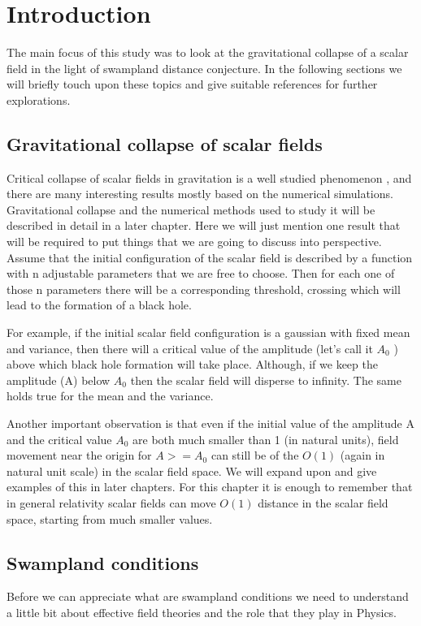 \chapter{Introduction}

The main focus of this study was to look at the gravitational collapse of a scalar field in the light of swampland distance conjecture. In the following sections we will briefly touch upon these topics and give suitable references for further explorations.

\section{Gravitational collapse of scalar fields}


Critical collapse of scalar fields in gravitation is a well studied phenomenon \citep{Gundlach:2007gc}, and there are many interesting results mostly based on the numerical simulations.
Gravitational collapse and the numerical methods used to study it will be described in detail in a later chapter. Here we will just mention one result that will be required to put things that we are going to discuss into perspective.
Assume that the initial configuration of the scalar field is described by a function with n adjustable parameters that we are free to choose. Then for each one of those n parameters there will be a corresponding threshold, crossing which will lead to the formation of a black hole.

For example, if the initial scalar field configuration is a gaussian with fixed mean and variance, then there will a critical value of the amplitude (let’s call it $A_0$ ) above which black hole formation will take place. Although, if we keep the amplitude (A) below $A_0$ then the scalar field will disperse to infinity. The same holds true for the mean and the variance.

Another important observation is that even if the initial value of the amplitude A and the critical value $A_0$ are both much smaller than 1 (in natural units), field movement near the origin for $A >= A_0$ can still be of the $O(1)$ (again in natural unit scale) in the scalar field space. We will expand upon and give examples of this in later chapters.
For this chapter it is enough to remember that in general relativity scalar fields can move $O(1)$ distance in the scalar field space, starting from much smaller values.

\section{Swampland conditions}
Before we can appreciate what are swampland conditions we need to understand a little bit about effective field theories and the role that they play in Physics.

